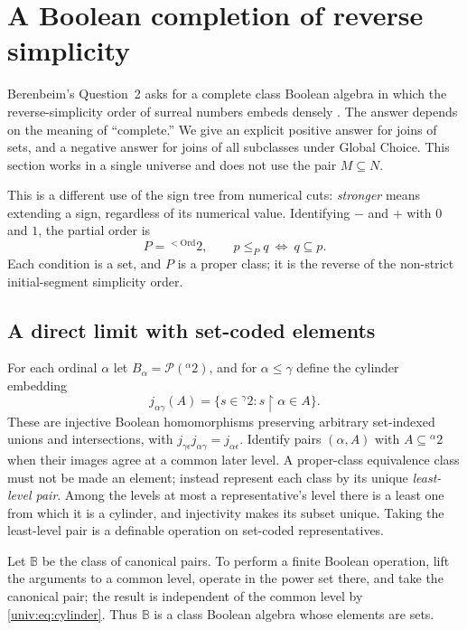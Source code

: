\documentclass[11pt,letterpaper]{article}
\numberwithin{equation}{section}
\theoremstyle{definition}
\theoremstyle{remark}
\newcommand{\Ord}{\mathrm{Ord}}
\newcommand{\Pow}{\mathcal P}
\newcommand{\res}{\mathbin{\upharpoonright}}
\begin{document}
\section{A Boolean completion of reverse simplicity}\label{univ:sec:boolean}

Berenbeim's Question~2 asks for a complete class Boolean algebra in which the
reverse-simplicity order of surreal numbers embeds densely
\cite[p.~32]{Berenbeim}. The answer depends on the meaning of ``complete.'' We
give an explicit positive answer for joins of sets, and a negative answer for
joins of all subclasses under Global Choice. This section works in a single
universe and does not use the pair $M\subseteq N$.

This is a different use of the sign tree from numerical cuts: \emph{stronger}
means extending a sign, regardless of its numerical value. Identifying $-$ and
$+$ with $0$ and $1$, the partial order is
\[
 P={}^{<\Ord}2,\qquad p\leq_P q\ \Longleftrightarrow\ q\subseteq p.
\]
Each condition is a set, and $P$ is a proper class; it is the reverse of the
non-strict initial-segment simplicity order.

\subsection{A direct limit with set-coded elements}

For each ordinal $\alpha$ let $B_\alpha=\Pow({}^\alpha2)$, and for
$\alpha\leq\gamma$ define the cylinder embedding
\begin{equation}\label{univ:eq:cylinder}
 j_{\alpha\gamma}(A)=\{s\in{}^\gamma2:s\res\alpha\in A\}.
\end{equation}
These are injective Boolean homomorphisms preserving arbitrary set-indexed
unions and intersections, with $j_{\gamma\epsilon}j_{\alpha\gamma}=j_{\alpha\epsilon}$.
Identify pairs $(\alpha,A)$ with $A\subseteq{}^\alpha2$ when their images agree
at a common later level. A proper-class equivalence class must not be made an
element; instead represent each class by its unique \emph{least-level pair}.
Among the levels at most a representative's level there is a least one from
which it is a cylinder, and injectivity makes its subset unique. Taking the
least-level pair is a definable operation on set-coded representatives.

Let $\mathbb B$ be the class of canonical pairs. To perform a finite Boolean
operation, lift the arguments to a common level, operate in the power set
there, and take the canonical pair; the result is independent of the common
level by \eqref{univ:eq:cylinder}. Thus $\mathbb B$ is a class Boolean algebra
whose elements are sets.
\end{document}
